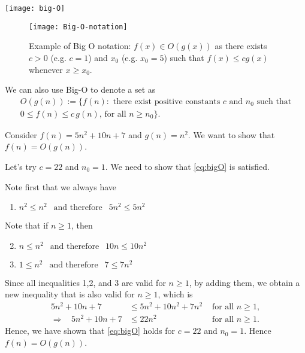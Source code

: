 \documentclass[../open-optimization/open-optimization.tex]{subfiles}
\begin{document}
\begin{center}
\texttt{[image: big-O]}
\end{center}
\begin{figure}[H]
\begin{center}
\texttt{[image: Big-O-notation]}\footnotemark
\end{center}
\caption{Example of Big O notation: $f(x) \in O(g(x))$ as there exists $c > 0 $ (e.g. $c = 1$) and $x_0$ (e.g. $x_0 = 5$) such that $f(x) \leq cg(x)$ whenever $x \geq x_0$.}
\end{figure}
We can also use Big-O to denote a set as
\begin{multline}
O(g(n)) := \{ f(n) :\text{ there exist positive constants $c$ and $n_0$ such that}\\ \text{$0 \leq f(n) \leq c\,g(n)$, for all $n \geq n_0$}\}.
\end{multline}
\begin{example}
\label{ex:bigO}
Consider $f(n) = 5 n^2 + 10n + 7$ and $g(n) = n^2$.  We want to show that $f(n) = O(g(n))$.  

Let's try $c = 22$ and $n_0 = 1$.  We need to show that \autoref{eq:bigO} is satisfied.

Note first that we always have
\begin{enumerate}
\item $n^2 \leq n^2 \ \ \text{ and therefore } \ \ 5n^2 \leq 5n^2$
\end{enumerate}
Note that if $n \geq 1$, then 
\begin{enumerate}
\setcounter{enumi}{1}
\item $n \leq n^2 \ \ \text{ and therefore } \ \ 10n \leq 10 n^2$
\item $1 \leq n^2 \ \ \text{ and therefore } \ \  7 \leq 7 n^2$
\end{enumerate}
Since all inequalities 1,2, and 3 are valid for $n\geq 1$, by adding them, we obtain a new inequality that is also valid for $n \geq 1$, which is
\begin{align}
5n^2 + 10n + 7 &\leq 5n^2 + 10n^2 + 7 n^2 & \text{ for all } n \geq 1,\\
\Rightarrow \ \ \ \  5n^2 + 10n + 7  & \leq 22 n^2 & \text{ for all } n \geq 1.
\end{align}
Hence, we have shown that \autoref{eq:bigO} holds for $c = 22$ and $n_0 = 1$.  Hence $f(n) = O(g(n))$.
\end{example}
\end{document}
